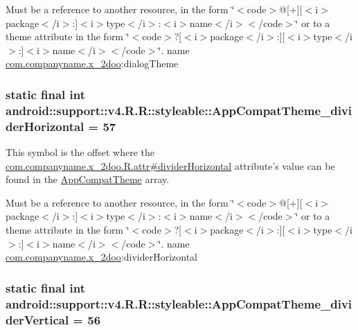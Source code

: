 Must be a reference to another resource, in the form \char`\"{}$<$code$>$@\mbox{[}+\mbox{]}\mbox{[}$<$i$>$package$<$/i$>$:\mbox{]}$<$i$>$type$<$/i$>$:$<$i$>$name$<$/i$>$$<$/code$>$\char`\"{} or to a theme attribute in the form \char`\"{}$<$code$>$?\mbox{[}$<$i$>$package$<$/i$>$:\mbox{]}\mbox{[}$<$i$>$type$<$/i$>$:\mbox{]}$<$i$>$name$<$/i$>$$<$/code$>$\char`\"{}.  name \hyperlink{namespacecom_1_1companyname_1_1x__2doo}{com.companyname.x\_\-2doo}:dialogTheme \hypertarget{classandroid_1_1support_1_1v4_1_1_r_1_1styleable_e74ae6f850a84137337f5a8fc61e97a0}{
\subsubsection[{AppCompatTheme\_\-dividerHorizontal}]{\setlength{\rightskip}{0pt plus 5cm}static final int android::support::v4.R.R::styleable::AppCompatTheme\_\-dividerHorizontal = 57}}
\label{classandroid_1_1support_1_1v4_1_1_r_1_1styleable_e74ae6f850a84137337f5a8fc61e97a0}


This symbol is the offset where the \hyperlink{classcom_1_1companyname_1_1x__2doo_1_1_r_1_1attr_4340022d2d1a7ccbb552d9834d51712e}{com.companyname.x\_\-2doo.R.attr\#dividerHorizontal} attribute's value can be found in the \hyperlink{classandroid_1_1support_1_1v4_1_1_r_1_1styleable_0873e92ba21076bb5a4aeadeb7f5779f}{AppCompatTheme} array.

Must be a reference to another resource, in the form \char`\"{}$<$code$>$@\mbox{[}+\mbox{]}\mbox{[}$<$i$>$package$<$/i$>$:\mbox{]}$<$i$>$type$<$/i$>$:$<$i$>$name$<$/i$>$$<$/code$>$\char`\"{} or to a theme attribute in the form \char`\"{}$<$code$>$?\mbox{[}$<$i$>$package$<$/i$>$:\mbox{]}\mbox{[}$<$i$>$type$<$/i$>$:\mbox{]}$<$i$>$name$<$/i$>$$<$/code$>$\char`\"{}.  name \hyperlink{namespacecom_1_1companyname_1_1x__2doo}{com.companyname.x\_\-2doo}:dividerHorizontal \hypertarget{classandroid_1_1support_1_1v4_1_1_r_1_1styleable_2cbf4f6a6038a3c0ee43fa2d8baf13be}{
\subsubsection[{AppCompatTheme\_\-dividerVertical}]{\setlength{\rightskip}{0pt plus 5cm}static final int android::support::v4.R.R::styleable::AppCompatTheme\_\-dividerVertical = 56}}
\label{classandroid_1_1support_1_1v4_1_1_r_1_1styleable_2cbf4f6a6038a3c0ee43fa2d8baf13be}


